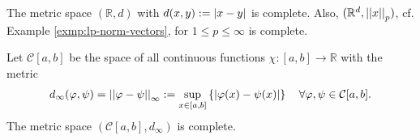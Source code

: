 \begin{exmp}
	The metric space $(\mathbb R, d)$ with $d(x, y) := \left\vert x - y \right\vert$ is \mbox{complete}. Also, $(\mathbb R^{d}, \left\vert\left\vert x \right\vert\right\vert_{p})$, cf. Example \ref{exmp:lp-norm-vectors}, for $1\leq p\leq \infty$ is complete.
\end{exmp}

\begin{exmp}\label{exmp:space-continuous-functions-complete}
	Let $\mathcal C[a, b]$ be the space of all continuous functions $\chi: [a, b]\to\mathbb{R}$ with the metric 
	\begin{align}\label{eq:metric_C[a,b]_real_valued}
		d_{\infty}(\varphi, \psi) = \left\vert\left\vert \varphi - \psi \right\vert\right\vert_{\infty} := \sup_{x\in [a, b]}\left\{ \left\vert \varphi(x) - \psi(x) \right\vert \right\} \quad\forall \varphi, \psi\in\mathcal C[a, b].
	\end{align}
	The metric space $(\mathcal C[a, b], d_{\infty})$ is complete.
\end{exmp}

